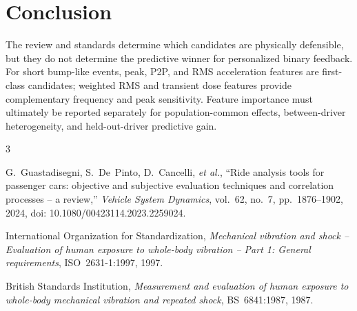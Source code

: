 \documentclass[letterpaper,journal]{IEEEtran}
\begin{document}
\section{Conclusion}

The review and standards determine which candidates are physically defensible, but they do
not determine the predictive winner for personalized binary feedback. For short bump-like
events, peak, P2P, and RMS acceleration features are first-class candidates; weighted RMS and
transient dose features provide complementary frequency and peak sensitivity. Feature
importance must ultimately be reported separately for population-common effects,
between-driver heterogeneity, and held-out-driver predictive gain.

\begin{thebibliography}{3}

G.~Guastadisegni, S.~De~Pinto, D.~Cancelli, \emph{et al.},
``Ride analysis tools for passenger cars: objective and subjective evaluation techniques
and correlation processes -- a review,'' \emph{Vehicle System Dynamics}, vol.~62, no.~7,
pp.~1876--1902, 2024, doi: 10.1080/00423114.2023.2259024.

International Organization for Standardization,
\emph{Mechanical vibration and shock -- Evaluation of human exposure to whole-body
vibration -- Part 1: General requirements}, ISO~2631-1:1997, 1997.

British Standards Institution,
\emph{Measurement and evaluation of human exposure to whole-body mechanical vibration
and repeated shock}, BS~6841:1987, 1987.

\end{thebibliography}
\end{document}

